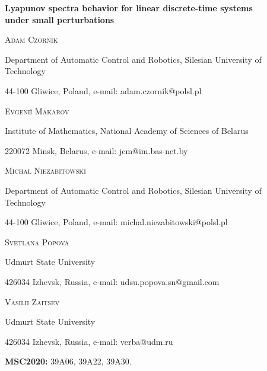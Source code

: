 \documentclass[11pt]{article}
\begin{document}
\begin{center}{\Large \noindent \bf Lyapunov spectra behavior for linear discrete-time systems \\ under small perturbations}
\end{center}

\bigskip


\centerline{\scshape Adam Czornik}
\medskip
{\footnotesize
 \centerline{Department of Automatic Control and Robotics, Silesian University of Technology}
      \centerline{44-100 Gliwice, Poland, e-mail: adam.czornik@polsl.pl}
} 

\medskip

\centerline{\scshape Evgeni\u{\i} Makarov}
\medskip
{\footnotesize
 \centerline{Institute of Mathematics, National Academy of
Sciences of Belarus}
      \centerline{220072 Minsk, Belarus, e-mail: jcm@im.bas-net.by}
} 

\medskip

\centerline{\scshape Micha{\l } Niezabitowski}
\medskip
{\footnotesize
 \centerline{Department of Automatic Control and Robotics, Silesian University of Technology}
      \centerline{44-100 Gliwice, Poland, e-mail: michal.niezabitowski@polsl.pl}
} 

\medskip

\centerline{\scshape Svetlana Popova}
\medskip
{\footnotesize
 \centerline{Udmurt State University}
      \centerline{426034 Izhevsk, Russia, e-mail: udsu.popova.sn@gmail.com}
}

\medskip

\centerline{\scshape Vasilii Zaitsev}
\medskip
{\footnotesize
 \centerline{Udmurt State University}
      \centerline{426034 Izhevsk, Russia, e-mail: verba@udm.ru}
}

\bigskip


\begin{abstract}
We investigate the behavior of the Lyapunov spectrum of a linear discrete-time system under the action 
of small perturbations in order to obtain some verifiable conditions for stability and openness of the Lyapunov spectrum. 
To this end we introduce the concepts of broken away solutions and splitted systems.
The main results obtained are a necessary condition for stability and a sufficient condition 
for the openness of the Lyapunov spectrum, which is given in terms of the system itself. 
Finally, examples of using the obtained results are presented.
\end{abstract}


{\bf MSC2020:} 39A06, 39A22, 39A30.
\end{document}
